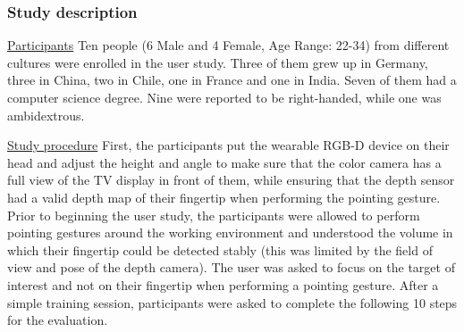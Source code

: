 \subsubsection{Study description}
\underline{Participants} Ten people (6 Male and 4 Female, Age Range: 22-34) from different cultures were enrolled in the user study. Three of them grew up in Germany, three in China, two in Chile, one in France and one in India. Seven of them had a computer science degree. Nine were reported to be right-handed, while one was ambidextrous.

\underline{Study procedure} First, the participants put the wearable RGB-D device on their head and adjust the height and angle to make sure that the color camera has a full view of the TV display in front of them, while ensuring that the depth sensor had a valid depth map of their fingertip when performing the pointing gesture. Prior to beginning the user study, the participants were allowed to perform pointing gestures around the working environment and understood the volume in which their fingertip could be detected stably (this was limited by the field of view and pose of the depth camera). The user was asked to focus on the target of interest and not on their fingertip when performing a pointing gesture. After a simple training session, participants were asked to complete the following 10 steps for the evaluation. 
